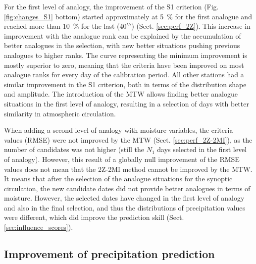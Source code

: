 \documentclass[hess, manuscript]{copernicus}
\begin{document}
	For the first level of analogy, the improvement of the S1 criterion (Fig. \ref{fig:changes_S1} bottom) started approximately at 5~\% for the first analogue and reached more than 10~\% for the last (40$^{th}$) (Sect. \ref{sec:perf_2Z}). This increase in improvement with the analogue rank can be explained by the accumulation of better analogues in the selection, with new better situations pushing previous analogues to higher ranks. The curve representing the minimum improvement is mostly superior to zero, meaning that the criteria have been improved on most analogue ranks for every day of the calibration period. All other stations had a similar improvement in the S1 criterion, both in terms of the distribution shape and amplitude. The introduction of the MTW allows finding better analogue situations in the first level of analogy, resulting in a selection of days with better similarity in atmospheric circulation.
	
	When adding a second level of analogy with moisture variables, the criteria values (RMSE) were not improved by the MTW (Sect. \ref{sec:perf_2Z-2MI}), as the number of candidates was not higher (still the $N_{1}$ days selected in the first level of analogy). However, this result of a globally null improvement of the RMSE values does not mean that the 2Z-2MI method cannot be improved by the MTW. It means that after the selection of the analogue situations for the synoptic circulation, the new candidate dates did not provide better analogues in terms of moisture. However, the selected dates have changed in the first level of analogy and also in the final selection, and thus the distributions of precipitation values were different, which did improve the prediction skill (Sect. \ref{sec:influence_scores}).
	
	
	\subsection{Improvement of precipitation prediction}
	
\end{document}
